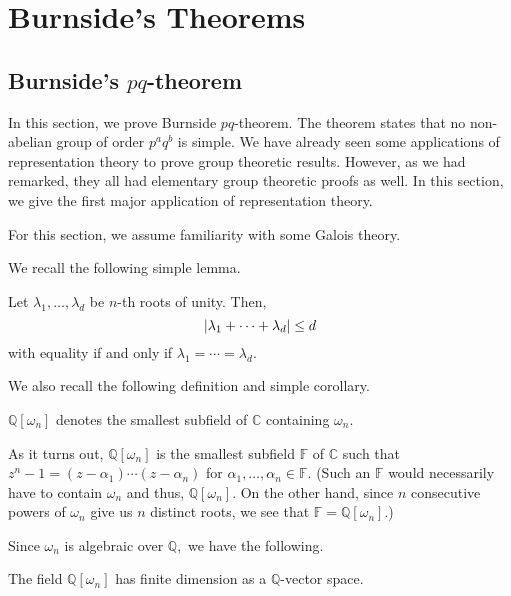 \section{Burnside's Theorems}

\subsection{Burnside's \texorpdfstring{$pq$}{pq}-theorem}

In this section, we prove Burnside $pq$-theorem. The theorem states that no non-abelian group of order $p^aq^b$ is simple. We have already seen some applications of representation theory to prove group theoretic results. However, as we had remarked, they all had elementary group theoretic proofs as well. In this section, we give the first major application of representation theory. 

For this section, we assume familiarity with some Galois theory.

We recall the following simple lemma.
\begin{lem} \label{lem:modofsumofrootsofunity}
	Let $\lambda_1, \ldots, \lambda_d$ be $n$-th roots of unity. Then,
	\begin{equation*} 
		{\left\lvert \lambda_1 + \cdots + \lambda_d \right\lvert} \le d
	\end{equation*}
	with equality if and only if $\lambda_1 = \cdots = \lambda_d.$
\end{lem}

We also recall the following definition and simple corollary.

\begin{defn}%
	$\mathbb{Q}[\omega_n]$ denotes the smallest subfield of $\mathbb{C}$ containing $\omega_n.$
\end{defn}

As it turns out, $\mathbb{Q}[\omega_n]$ is the smallest subfield $\mathbb{F}$ of $\mathbb{C}$ such that $z^n - 1 = (z - \alpha_1) \cdots (z - \alpha_n)$ for $\alpha_1, \ldots, \alpha_n \in \mathbb{F}.$ (Such an $\mathbb{F}$ would necessarily have to contain $\omega_n$ and thus, $\mathbb{Q}[\omega_n].$ On the other hand, since $n$ consecutive powers of $\omega_n$ give us $n$ distinct roots, we see that $\mathbb{F} = \mathbb{Q}[\omega_n].$) 

Since $\omega_n$ is algebraic over $\mathbb{Q},$ we have the following.

\begin{lem} 
	The field $\mathbb{Q}[\omega_n]$ has finite dimension as a $\mathbb{Q}$-vector space.
\end{lem}

